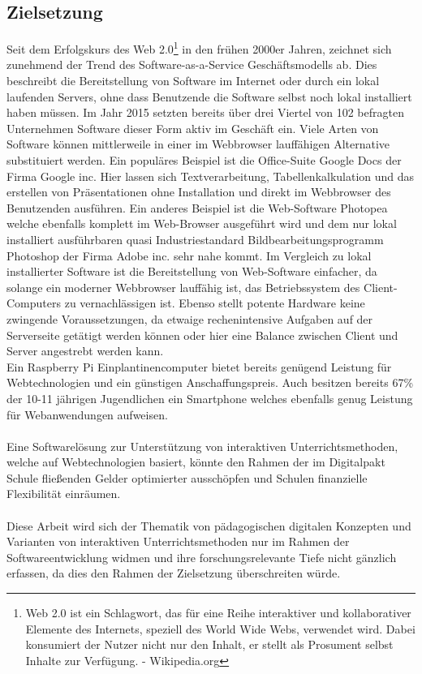 \subsection{Zielsetzung}\label{sec:zielsetzung}
Seit dem Erfolgskurs des Web 2.0\footnote{Web 2.0 ist ein Schlagwort, das für eine Reihe interaktiver und kollaborativer Elemente des Internets, speziell des World Wide Webs, verwendet wird. Dabei konsumiert der Nutzer nicht nur den Inhalt, er stellt als Prosument selbst Inhalte zur Verfügung. - Wikipedia.org} in den frühen 2000er Jahren, zeichnet sich zunehmend der Trend des Software-as-a-Service Geschäftsmodells ab. Dies beschreibt die Bereitstellung von Software im Internet oder durch ein lokal laufenden Servers, ohne dass Benutzende die Software selbst noch lokal installiert haben müssen. Im Jahr 2015 setzten bereits über drei Viertel von 102 befragten Unternehmen Software dieser Form aktiv im Geschäft ein\cite{TecArt-GmbH2019:online}. Viele Arten von Software können  mittlerweile in einer im Webbrowser lauffähigen Alternative substituiert werden. Ein populäres Beispiel ist die Office-Suite Google Docs der Firma Google inc. Hier lassen sich Textverarbeitung, Tabellenkalkulation und das erstellen von Präsentationen ohne Installation und direkt im Webbrowser des Benutzenden ausführen. Ein anderes Beispiel ist die Web-Software Photopea welche ebenfalls komplett im Web-Browser ausgeführt wird und dem nur lokal installiert ausführbaren quasi Industriestandard Bildbearbeitungsprogramm Photoshop der Firma Adobe inc. sehr nahe kommt. Im Vergleich zu lokal installierter Software ist die Bereitstellung von Web-Software einfacher, da solange ein moderner Webbrowser lauffähig ist, das Betriebssystem des Client-Computers zu vernachlässigen ist. Ebenso stellt potente Hardware keine zwingende Voraussetzungen, da etwaige rechenintensive Aufgaben auf der Serverseite getätigt werden können oder hier eine Balance zwischen Client und Server angestrebt werden kann. \\ 
Ein Raspberry Pi Einplantinencomputer bietet bereits genügend Leistung für Webtechnologien und ein günstigen Anschaffungspreis. Auch besitzen bereits 67\% der 10-11 jährigen Jugendlichen ein Smartphone \cite{Statista2017:online} welches ebenfalls genug Leistung für Webanwendungen aufweisen. \\ \\ Eine Softwarelösung zur Unterstützung von interaktiven Unterrichtsmethoden, welche auf Webtechnologien basiert, könnte den Rahmen der im Digitalpakt Schule fließenden Gelder optimierter ausschöpfen und Schulen finanzielle Flexibilität einräumen. 
\\ \\
Diese Arbeit wird sich der Thematik von pädagogischen digitalen Konzepten und Varianten von interaktiven Unterrichtsmethoden nur im Rahmen der Softwareentwicklung widmen und ihre forschungsrelevante Tiefe nicht gänzlich erfassen, da dies den Rahmen der Zielsetzung überschreiten würde.


